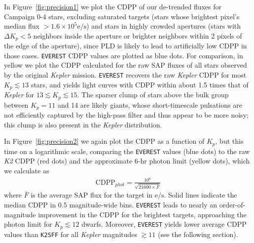 \documentclass[]{emulateapj}
\begin{document}
In Figure~\ref{fig:precision1} we plot the CDPP of our de-trended fluxes for Campaign 0-4 
stars, excluding saturated targets (stars whose brightest pixel's median flux $> 1.6\times 10^5 \mathrm{e/s}$) 
and stars in highly crowded apertures (stars with $\Delta K_p < 5$ neighbors
inside the aperture or brighter neighbors within 2 pixels of the edge of the aperture),
since PLD is likely to lead to artificially low CDPP in those cases. \texttt{EVEREST}
CDPP values are plotted as blue dots. For comparison, in yellow we plot the CDPP calculated for the raw
SAP fluxes of all stars observed by the original \emph{Kepler} mission. 
\texttt{EVEREST} recovers the raw \emph{Kepler} CDPP for most $K_p \lesssim 13$ stars,
and yields light curves with CDPP within about 1.5 times that of \emph{Kepler}
for $13 \lesssim K_p \lesssim 15$. The sparser clump of stars above the bulk group between
$K_p = 11$ and 14 are likely giants, whose short-timescale pulsations are not efficiently
captured by the high-pass filter and thus appear to be more noisy; this clump is also
present in the \emph{Kepler} distribution.

In Figure~\ref{fig:precision2} we again plot the CDPP as a function of $K_p$, but this time
on a logarithmic scale, comparing the \texttt{EVEREST} values (blue dots) to the raw \emph{K2}
CDPP (red dots) and the approximate 6-hr photon limit (yellow dots), which we calculate as
\begin{align}
\label{eq:phot}
\mathrm{CDPP}_{phot} = \frac{10^6}{\sqrt{21600\times\bar{F}}}
\end{align}
where $\bar{F}$ is the average SAP flux for the target in $\mathrm{e/s}$. Solid lines indicate
the median CDPP in 0.5 magnitude-wide bins. \texttt{EVEREST} leads to nearly an order-of-magnitude
improvement in the CDPP for the brightest targets, approaching the photon limit for 
$K_p \lesssim 12$ dwarfs. Moreover, \texttt{EVEREST} yields lower average CDPP values than
\texttt{K2SFF} for all \emph{Kepler} magnitudes $\gtrsim 11$ (see the following section).
\end{document}

